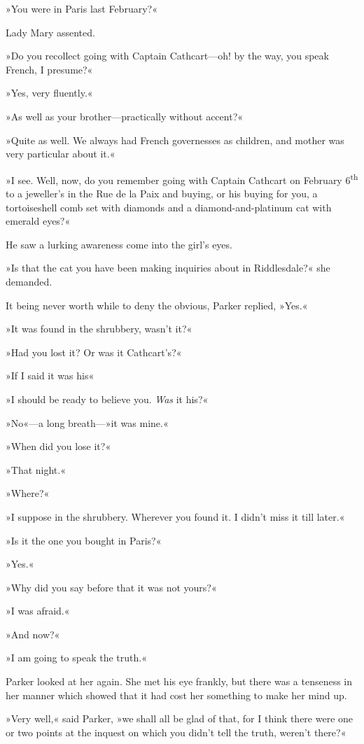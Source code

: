 »You were in Paris last February?«

Lady Mary assented.

»Do you recollect going with Captain Cathcart—oh! by the way, you speak French, I presume?«

»Yes, very fluently.«

»As well as your brother—practically without accent?«

»Quite as well. We always had French governesses as children, and mother was very particular about it.«

»I see. Well, now, do you remember going with Captain Cathcart on February 6\textsuperscript{th} to a jeweller's in the Rue de la Paix and buying, or his buying for you, a tortoiseshell comb set with diamonds and a diamond-and-platinum cat with emerald eyes?«

He saw a lurking awareness come into the girl's eyes.

»Is that the cat you have been making inquiries about in Riddlesdale?« she demanded.

It being never worth while to deny the obvious, Parker replied, »Yes.«

»It was found in the shrubbery, wasn't it?«

»Had you lost it? Or was it Cathcart's?«

»If I said it was his\longdash«

»I should be ready to believe you. \textit{Was} it his?«

»No«—a long breath—»it was mine.«

»When did you lose it?«

»That night.«

»Where?«

»I suppose in the shrubbery. Wherever you found it. I didn't miss it till later.«

»Is it the one you bought in Paris?«

»Yes.«

»Why did you say before that it was not yours?«

»I was afraid.«

»And now?«

»I am going to speak the truth.«

Parker looked at her again. She met his eye frankly, but there was a tenseness in her manner which showed that it had cost her something to make her mind up.

»Very well,« said Parker, »we shall all be glad of that, for I think there were one or two points at the inquest on which you didn't tell the truth, weren't there?«


